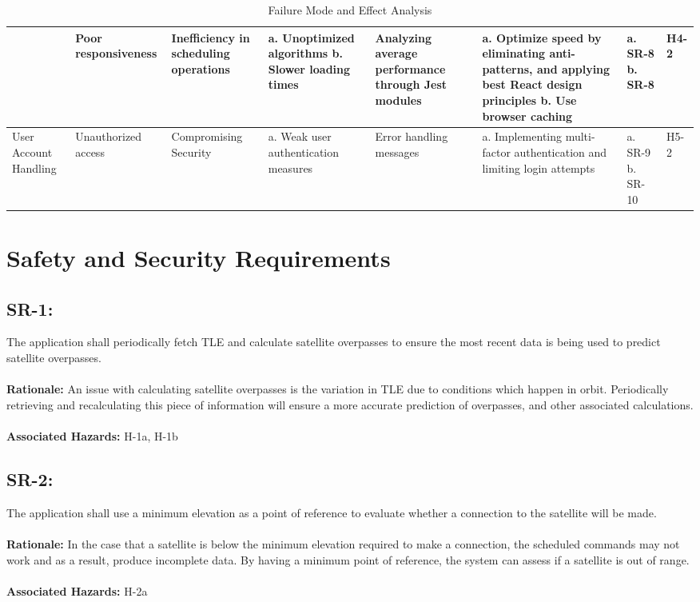 \documentclass{article}
\begin{document}
\begin{landscape}
\begin{table}[ht]
{\begin{tabular}{|p{1.75cm}|p{4cm}|p{5cm}|p{5cm}|p{3cm}|p{5cm}|p{2cm}|p{2cm}|}
    \cline{2-8}
     & Poor responsiveness & Inefficiency in scheduling operations & a. Unoptimized algorithms \newline b. Slower loading times & Analyzing average performance through Jest modules & a. Optimize speed by eliminating anti-patterns, and applying best React design principles \newline b. Use browser caching & a. SR-8 \newline b. SR-8 & H4-2 \\
    \hline
    User Account Handling & Unauthorized access & Compromising Security & a. Weak user authentication measures & Error handling messages & a. Implementing multi-factor authentication and limiting login attempts & a. SR-9 \newline b. SR-10 & H5-2 \\
    \hline
    \end{tabular}
    } %
    \caption{Failure Mode and Effect Analysis}
    \label{table:fmea}
    \end{table}

\end{landscape}

\section{Safety and Security Requirements}

\subsection*{SR-1:}
The application shall periodically fetch TLE and calculate satellite overpasses to ensure the most recent data is being used to predict satellite overpasses. \\ \\
\textbf{Rationale:} An issue with calculating satellite overpasses is the variation in TLE due to conditions which happen in orbit. Periodically retrieving and recalculating this piece of information will ensure a more accurate prediction of overpasses, and other associated calculations.  \\ \\
\textbf{Associated Hazards:}  H-1a, H-1b


\subsection*{SR-2:}
The application shall use a minimum elevation as a point of reference to evaluate whether a connection to the satellite will be made. \\ \\
\textbf{Rationale:} In the case that a satellite is below the minimum elevation required to make a connection, the scheduled commands may not work and as a result, produce incomplete data. By having a minimum point of reference, the system can assess if a satellite is out of range. \\ \\
\textbf{Associated Hazards:}  H-2a
\end{document}
